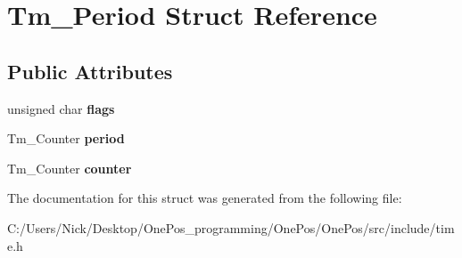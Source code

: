 \hypertarget{struct_tm___period}{\section{Tm\-\_\-\-Period Struct Reference}
\label{struct_tm___period}
}
\subsection*{Public Attributes}
\begin{DoxyCompactItemize}
\item 
\hypertarget{struct_tm___period_af0af4404b8a207d998890b97249b6401}{unsigned char {\bfseries flags}}\label{struct_tm___period_af0af4404b8a207d998890b97249b6401}

\item 
\hypertarget{struct_tm___period_a4332c910718fd41449b5c1b89a71cccb}{Tm\-\_\-\-Counter {\bfseries period}}\label{struct_tm___period_a4332c910718fd41449b5c1b89a71cccb}

\item 
\hypertarget{struct_tm___period_aabde10c150e1b0c68413a9719168a2af}{Tm\-\_\-\-Counter {\bfseries counter}}\label{struct_tm___period_aabde10c150e1b0c68413a9719168a2af}

\end{DoxyCompactItemize}


The documentation for this struct was generated from the following file\-:\begin{DoxyCompactItemize}
\item 
C\-:/\-Users/\-Nick/\-Desktop/\-One\-Pos\-\_\-programming/\-One\-Pos/\-One\-Pos/src/include/time.\-h\end{DoxyCompactItemize}
